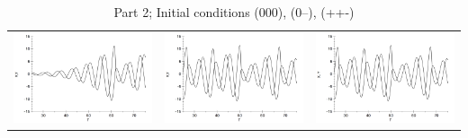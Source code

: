 \documentclass[12pt,letterpaper,notitlepage]{article}
\begin{document}
\begin{landscape}
\begin{table}
\caption{Part 2; Initial conditions (000), (0--), (++-)}
\hspace{-.75in}
  \begin{tabular}{ccc} 
      \parbox[c]{1em}{\includegraphics[width=3in]{zerot.png}} &
      \hspace{2.5in}       
      \parbox[c]{1em}{\includegraphics[width=3in]{negt.png}}  &
      \hspace{2.5in} 
       \parbox[c]{1em}{\includegraphics[width=3in]{post.png}}
      \\
 \end{tabular}
\end{table}



\end{landscape}
\end{document}
